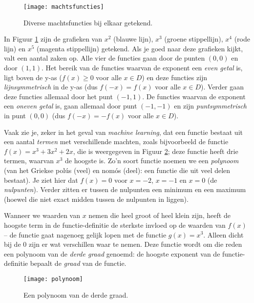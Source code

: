 \begin{figure}[h]
    \centering
    \texttt{[image: machtsfuncties]}
    \caption{Diverse machtsfuncties bij elkaar getekend.\label{img:machtsfuncties}}
\end{figure}

In Figuur \ref{img:machtsfuncties} zijn de grafieken van $x^2$ (blauwe lijn), $x^3$ (groene stippellijn), $x^4$ (rode lijn) en $x^5$ (magenta stippellijn) getekend. Als je goed naar deze grafieken kijkt, valt een aantal zaken op. Alle vier de functies gaan door de punten $(0,0)$ en door $(1,1)$. Het bereik van de functies waarvan de exponent een \textit{even getal} is, ligt boven de y-as ($f(x) \geq 0$ voor alle $x \in D$) en deze functies zijn \textit{lijnsymmetrisch} in de y-as (dus $f(-x) = f(x)$ voor alle $x \in D$). Verder gaan deze functies allemaal door het punt $(-1, 1)$. De functies waarvan de exponent een \textit{oneven getal} is, gaan allemaal door punt $(-1,-1)$ en zijn \textit{puntsymmetrisch} in punt $(0,0)$ (dus $f(-x)=-f(x)$ voor alle $x \in D$).

Vaak zie je, zeker in het geval van \textit{machine learning}, dat een functie bestaat uit een aantal \textit{termen} met verschillende machten, zoals bijvoorbeeld de functie $f(x) = x^3+3x^2+2x$, die is weergegeven in Figuur \ref{img:polynoom}; deze functie heeft drie termen, waarvan $x^3$ de hoogste is. Zo'n soort functie noemen we een \textit{polynoom} (van het Griekse polús (veel) en nomós (deel): een functie die uit veel delen bestaat). Je ziet hier dat $f(x)=0$ voor $x=-2$, $x=-1$ en $x=0$ (de \textit{nulpunten}). Verder zitten er tussen de nulpunten een minimum en een maximum (hoewel die niet exact midden tussen de nulpunten in liggen). 

Wanneer we waarden van $x$ nemen die heel groot of heel klein zijn, heeft de hoogste term in de functie-definitie de sterkste invloed op de waarden van $f(x)$ – de functie gaat nagenoeg gelijk lopen met de functie $g(x)=x^3$. Alleen dicht bij de 0 zijn er wat verschillen waar te nemen. Deze functie wordt om die reden een polynoom van de \textit{derde graad} genoemd: de hoogste exponent van de functie-definitie bepaalt de \textit{graad} van de functie.

\begin{figure}[h]
    \centering
    \texttt{[image: polynoom]}
    \caption{Een polynoom van de derde graad.\label{img:polynoom}}
\end{figure}

